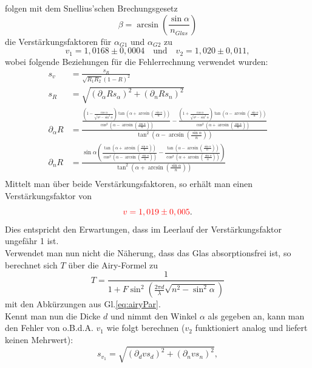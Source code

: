 folgen mit dem Snellius'schen Brechungsgesetz
\begin{equation*}
    \beta = \arcsin(\frac{\sin\alpha}{n_{Glas}})
\end{equation*}
die Verstärkungsfaktoren für $\alpha_{G1}$ und $\alpha_{G2}$ zu 
\begin{equation*}
    v_1 = 1,0168 \pm 0,0004 \quad \mathrm{ und } \quad v_2 = 1,020 \pm 0,011,
\end{equation*}
wobei folgende Beziehungen für die Fehlerrechnung verwendet wurden:
\begin{align*}
    s_v &= \frac{s_R}{\sqrt{R_1R_2}(1-R)^2}\\
    s_R &= \sqrt{(\partial_\alpha R s_\alpha)^2 + (\partial_nRs_n)^2}\\
    \partial_\alpha R &= \frac{\frac{(1-\frac{\cos\alpha}{\sqrt{n^2-\sin^2\alpha}})\tan(\alpha+\arcsin(\frac{\sin\alpha}{n}))} {\cos^2(\alpha-\arcsin(\frac{\sin\alpha}{n}))} - \frac{(1+\frac{\cos\alpha}{\sqrt{n^2-\sin^2\alpha}})\tan(\alpha-\arcsin(\frac{\sin\alpha}{n}))} {\cos^2(\alpha+\arcsin(\frac{\sin\alpha}{n}))}} {\tan^2(\alpha - \arcsin(\frac{\sin\alpha}{n}))}\\
    \partial_nR &= \frac{\sin\alpha(\frac{\tan(\alpha+\arcsin(\frac{\sin\alpha}{n}))}{\cos^2(\alpha-\arcsin(\frac{\sin\alpha}{n}))} - \frac{\tan(\alpha-\arcsin(\frac{\sin\alpha}{n}))}{\cos^2(\alpha+\arcsin(\frac{\sin\alpha}{n}))})}{\tan^2(\alpha + \arcsin(\frac{\sin\alpha}{n}))}\\
\end{align*}
Mittelt man über beide Verstärkungsfaktoren, so erhält man einen Verstärkungsfaktor von 
\begin{equation*}
    \textcolor{red}{v = 1,019 \pm 0,005}.
\end{equation*}
Dies entspricht den Erwartungen, dass im Leerlauf der Verstärkungsfaktor ungefähr 1 ist.\\
Verwendet man nun nicht die Näherung, dass das Glas absorptionsfrei ist, so berechnet sich $T$ über die Airy-Formel zu 
\begin{equation*}
    T = \frac{1}{1+F\sin^2(\frac{2\pi d}{\lambda}\sqrt{n^2-\sin^2\alpha})}
\end{equation*}
mit den Abkürzungen aus Gl.\ref{eq:airyPar}.\\
Kennt man nun die Dicke $d$ und nimmt den Winkel $\alpha$ als gegeben an, kann man den Fehler von o.B.d.A. $v_1$ wie folgt berechnen ($v_2$ funktioniert analog und liefert keinen Mehrwert):
\begin{equation*}
    s_{v_1} = \sqrt{(\partial_dvs_d)^2 + (\partial_nvs_n)^2},
\end{equation*}
